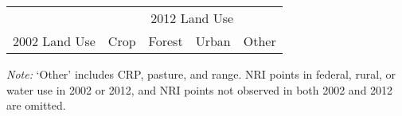 \begin{threeparttable}[ht!]

\captionsetup{justification=raggedright,
singlelinecheck=false}

\caption[]{US land use transitions from 2002 to 2012}

\begin{tabular}{L{1in} C{0.5in} C{0.5in} C{0.5in} C{0.5in}}
\toprule
 &  \\  \cmidrule(l{2pt}r{2pt}){2-5}
2002 Land Use & Crop & Forest & Urban & Other \\ \midrule

\end{tabular}
\begin{tablenotes}
\item {\em Note:} `Other' includes CRP, pasture, and range. NRI points in federal, rural, or water use in 2002 or 2012, and NRI points not observed in both 2002 and 2012 are omitted. 
\end{tablenotes}
\end{threeparttable}
